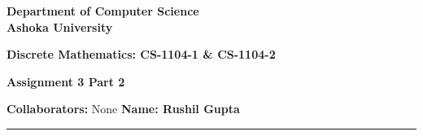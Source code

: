 \documentclass[a4paper]{article}
\begin{document}
\begin{center}
{\large \bf \color{red}  Department of Computer Science} \\
{\large \bf \color{red}  Ashoka University} \\

\vspace{0.1in}

{\large \bf \color{blue}  Discrete Mathematics: CS-1104-1 \& CS-1104-2}

\vspace{0.05in}

    { \bf \color{YellowOrange} Assignment 3 Part 2}
\end{center}
\medskip

{\textbf{Collaborators:} None} \hfill {\textbf{Name: Rushil Gupta} }

\bigskip
\hrule


\end{document}
